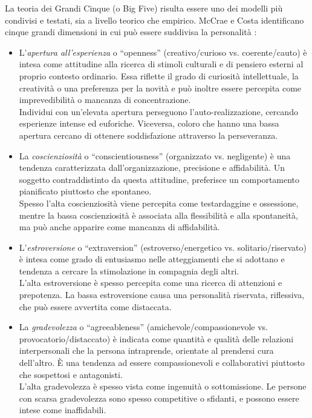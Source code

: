La teoria dei Grandi Cinque (o Big Five) risulta essere uno dei modelli più condivisi e testati, sia a livello teorico che empirico.
McCrae e Costa identificano cinque grandi dimensioni in cui può essere suddivisa la personalità \cite{goldberg1993structure,costa2008revised}:
\begin{itemize}
	\item L'\emph{apertura all'esperienza} o ``openness'' (creativo/curioso vs. coerente/cauto) è intesa come attitudine alla ricerca di stimoli culturali e di pensiero esterni al proprio contesto ordinario.
	Essa riflette il grado di curiosità intellettuale, la creatività o una preferenza per la novità e può inoltre essere percepita come imprevedibilità o mancanza di concentrazione. \\ 
	Individui con un'elevata apertura perseguono l'auto-realizzazione, cercando esperienze intense ed euforiche. Viceversa, coloro che hanno una bassa apertura cercano di ottenere soddisfazione attraverso la perseveranza.
	
	\item La \emph{coscienziosità} o ``conscientiousness'' (organizzato vs. negligente) è una tendenza caratterizzata dall'organizzazione, precisione e affidabilità. Un soggetto contraddistinto da questa attitudine, preferisce un comportamento pianificato piuttosto che spontaneo.\\  
	Spesso l'alta coscienziosità viene percepita come testardaggine e ossessione, mentre la bassa coscienziosità è associata alla flessibilità e alla spontaneità, ma può anche apparire come mancanza di affidabilità.
		
	\item L'\emph{estroversione} o ``extraversion''  (estroverso/energetico vs. solitario/riservato) è intesa come grado di entusiasmo nelle atteggiamenti che si adottano e tendenza a cercare la stimolazione in compagnia degli altri.\\ 
	L'alta estroversione è spesso percepita come una ricerca di attenzioni e prepotenza. La bassa estroversione causa una personalità riservata, riflessiva, che può essere avvertita come distaccata.  
	
	\item La \emph{gradevolezza} o ``agreeableness'' (amichevole/compassionevole vs. provocatorio/distaccato) è indicata come quantità e qualità delle relazioni interpersonali che la persona intraprende, orientate al prendersi cura dell'altro. È una tendenza ad essere compassionevoli e collaborativi piuttosto che sospettosi e antagonisti. \\
	L'alta gradevolezza è spesso vista come ingenuità o sottomissione. Le persone con scarsa gradevolezza sono spesso competitive o sfidanti, e possono essere intese come inaffidabili.


\end{itemize}
